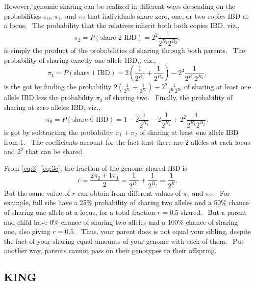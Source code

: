 \documentclass[
]{book}
\begin{document}
However, genomic sharing can be realized in different ways depending on the probabilities \(\pi_0\), \(\pi_1\), and \(\pi_2\) that individuals share zero, one, or two copies IBD at a locus.~ The probability that the relatives inherit both both copies IBD, viz.,\begin{equation}
\pi_2=P\left(\text{share 2 IBD}\right)=2^2\frac{1}{2^{R_1}2^{R_2}},
\label{eq:3a}
\end{equation}is simply the product of the probabilities of sharing through both parents.~ The probability of sharing exactly one allele IBD,, viz.,\begin{equation}
\pi_1=P\left(\text{share 1 IBD}\right)=2\left(\frac{1}{2^{R_1}}+\frac{1}{2^{R_2}}\right)-2^3\frac{1}{2^{R_1}2^{R_2}},
\label{eq:3b}\end{equation}is the got by finding the probability \(2\left(\frac{1}{2^{R_1}}+\frac{1}{2^{R_2}}\right)-2^2\frac{1}{2^{R_1}2^{R_2}}\) of sharing at least one allele IBD less the probability \(\pi_2\) of sharing two.~ Finally, the probability of sharing at zero alleles IBD, viz.,\begin{equation}
\pi_0=P\left(\text{share 0 IBD}\right)=1-2\frac{1}{2^{R_1}}-2\frac{1}{2^{R_2}}+2^2\frac{1}{2^{R_1}2^{R_2}},
\label{eq:3c}
\end{equation}is got by subtracting the probability \(\pi_1+\pi_2\) of sharing at least one allele IBD from 1.~ The coefficients account for the fact that there are \(2\) alleles at each locus and \(2^2\) that can be shared.

From \eqref{eq:3}--\eqref{eq:3c}, the fraction of the genome shared IBD is\begin{equation}
r=\frac{2\pi_2+1\pi_1}{2}=\frac{1}{2^{R_1}}+\frac{1}{2^{R_2}}=\frac{1}{2^R}.
\label{eq:4}
\end{equation}But the same value of \(r\) can obtain from different values of \(\pi_1\) and \(\pi_2\).~ For example, full sibs have a 25\% probability of sharing two alleles and a 50\% chance of sharing one allele at a locus, for a total fraction \(r=0.5\) shared.~ But a parent and child have 0\% chance of sharing two alleles and a 100\% chance of sharing one, also giving \(r=0.5\).~ Thus, your parent does is not equal your sibling, despite the fact of your sharing equal amounts of your genome with each of them.~ Put another way, parents cannot pass on their genotypes to their offspring.

\hypertarget{king}{%
\subsection{KING}\label{king}}
\end{document}

